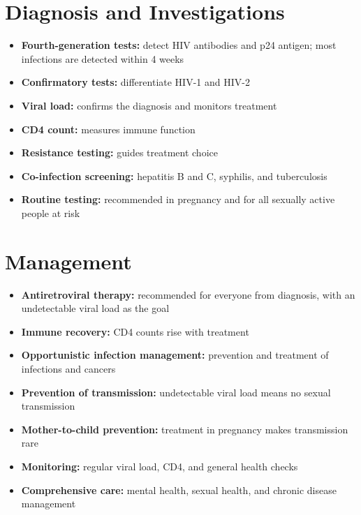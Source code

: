 \section*{Diagnosis and Investigations}
\begin{itemize}
    \item \textbf{Fourth-generation tests:} detect HIV antibodies and p24 antigen; most infections are detected within 4 weeks
    \item \textbf{Confirmatory tests:} differentiate HIV-1 and HIV-2
    \item \textbf{Viral load:} confirms the diagnosis and monitors treatment
    \item \textbf{CD4 count:} measures immune function
    \item \textbf{Resistance testing:} guides treatment choice
    \item \textbf{Co-infection screening:} hepatitis B and C, syphilis, and tuberculosis
    \item \textbf{Routine testing:} recommended in pregnancy and for all sexually active people at risk
\end{itemize}

\section*{Management}
\begin{itemize}
    \item \textbf{Antiretroviral therapy:} recommended for everyone from diagnosis, with an undetectable viral load as the goal
    \item \textbf{Immune recovery:} CD4 counts rise with treatment
    \item \textbf{Opportunistic infection management:} prevention and treatment of infections and cancers
    \item \textbf{Prevention of transmission:} undetectable viral load means no sexual transmission
    \item \textbf{Mother-to-child prevention:} treatment in pregnancy makes transmission rare
    \item \textbf{Monitoring:} regular viral load, CD4, and general health checks
    \item \textbf{Comprehensive care:} mental health, sexual health, and chronic disease management
\end{itemize}

